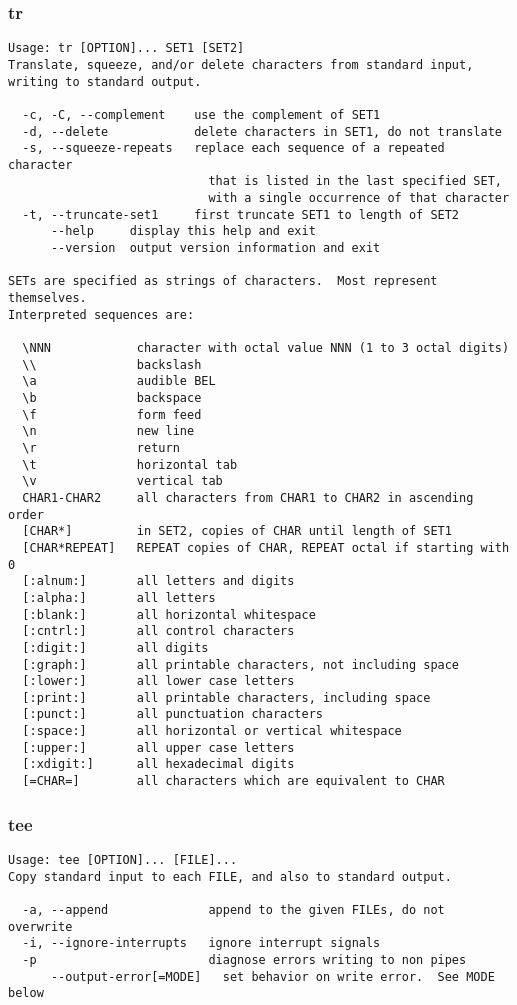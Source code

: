 \documentclass[11pt,a4paper]{article}
\newcommand{\cmd}[1]{
  \subsubsection*{#1}
  \addcontentsline{toc}{subsection}{#1}
}
\begin{document}
\cmd{tr}
\begin{verbatim}
Usage: tr [OPTION]... SET1 [SET2]
Translate, squeeze, and/or delete characters from standard input,
writing to standard output.

  -c, -C, --complement    use the complement of SET1
  -d, --delete            delete characters in SET1, do not translate
  -s, --squeeze-repeats   replace each sequence of a repeated character
                            that is listed in the last specified SET,
                            with a single occurrence of that character
  -t, --truncate-set1     first truncate SET1 to length of SET2
      --help     display this help and exit
      --version  output version information and exit

SETs are specified as strings of characters.  Most represent themselves.
Interpreted sequences are:

  \NNN            character with octal value NNN (1 to 3 octal digits)
  \\              backslash
  \a              audible BEL
  \b              backspace
  \f              form feed
  \n              new line
  \r              return
  \t              horizontal tab
  \v              vertical tab
  CHAR1-CHAR2     all characters from CHAR1 to CHAR2 in ascending order
  [CHAR*]         in SET2, copies of CHAR until length of SET1
  [CHAR*REPEAT]   REPEAT copies of CHAR, REPEAT octal if starting with 0
  [:alnum:]       all letters and digits
  [:alpha:]       all letters
  [:blank:]       all horizontal whitespace
  [:cntrl:]       all control characters
  [:digit:]       all digits
  [:graph:]       all printable characters, not including space
  [:lower:]       all lower case letters
  [:print:]       all printable characters, including space
  [:punct:]       all punctuation characters
  [:space:]       all horizontal or vertical whitespace
  [:upper:]       all upper case letters
  [:xdigit:]      all hexadecimal digits
  [=CHAR=]        all characters which are equivalent to CHAR
\end{verbatim}


\cmd{tee}
\begin{verbatim}
Usage: tee [OPTION]... [FILE]...
Copy standard input to each FILE, and also to standard output.

  -a, --append              append to the given FILEs, do not overwrite
  -i, --ignore-interrupts   ignore interrupt signals
  -p                        diagnose errors writing to non pipes
      --output-error[=MODE]   set behavior on write error.  See MODE below
\end{verbatim}
\end{document}
